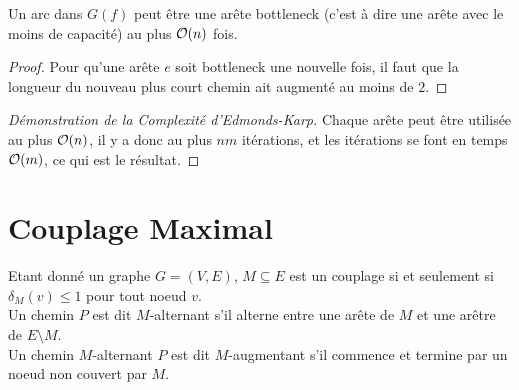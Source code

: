 \documentclass[math, info]{cours}
\begin{document}
\begin{lemme}
	Un arc dans $G(f)$ peut être une arête bottleneck (c'est à dire une arête avec le moins de capacité) au plus $\mathcal{O}(n)$ fois.
\end{lemme}
\begin{proof}
	Pour qu'une arête $e$ soit bottleneck une nouvelle fois, il faut que la longueur du nouveau plus court chemin ait augmenté au moins de $2$.
\end{proof}


\begin{proof}[Démonstration de la Complexité d'Edmonds-Karp]
	Chaque arête peut être utilisée au plus $\mathcal{O}(n)$, il y a donc au plus $nm$ itérations, et les itérations se font en temps $\mathcal{O}(m)$, ce qui est le résultat.
\end{proof}

\section{Couplage Maximal}
\begin{definition}
	Etant donné un graphe $G = \left(V, E \right)$, $M \subseteq E$ est un couplage si et seulement si $\delta_{M}(v) \leq 1$ pour tout noeud $v$.\\
	Un chemin $P$ est dit $M$-alternant s'il alterne entre une arête de $M$ et une arêtre de $E\setminus M$. \\
	Un chemin $M$-alternant $P$ est dit $M$-augmentant s'il commence et termine par un noeud non couvert par $M$.
	\label{def:matching}
\end{definition}
\end{document}
